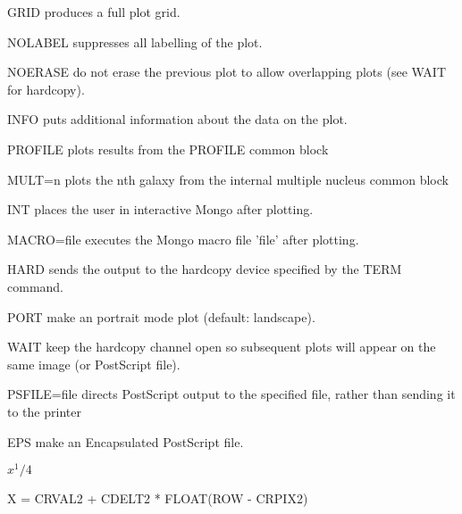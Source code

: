 {\begin{command}
  \item[GRID]{produces a full plot grid.}
  \item[NOLABEL]{suppresses all labelling of the plot.}
  \item[NOERASE]{do not erase the previous plot to allow overlapping
       plots (see WAIT for hardcopy).}
  \item[INFO]{puts additional information about the data on the plot.}
  \item[PROFILE ]{plots results from the PROFILE common block}
  \item[MULT=n ]{plots the nth galaxy from the internal multiple
        nucleus common block}
  \item[INT]{places the user in interactive Mongo after plotting.}
  \item[MACRO=file ]{executes the Mongo macro file 'file' after plotting.}
  \item[HARD]{sends the output to the hardcopy device specified by
       the TERM command.}
  \item[PORT]{make an portrait mode plot (default: landscape).}
  \item[WAIT]{keep the hardcopy channel open so subsequent plots will
              appear on the same image (or PostScript file).}
  \item[PSFILE=file]{directs PostScript output to the specified file,
       rather than sending it to the printer}
  \item[EPS]{make an Encapsulated PostScript file.}
\end{command}%
\lthtmlfigureZ
\lthtmlcheckvsize\clearpage}

{\newpage\clearpage
{}%
$x^1/4$%
\lthtmlinlinemathZ
\lthtmlcheckvsize\clearpage}

{\newpage\clearpage
{}%
\begin{hanging}
  \item{X = CRVAL2 + CDELT2 * FLOAT(ROW - CRPIX2)}
\end{hanging}%
\lthtmlfigureZ
\lthtmlcheckvsize\clearpage}

